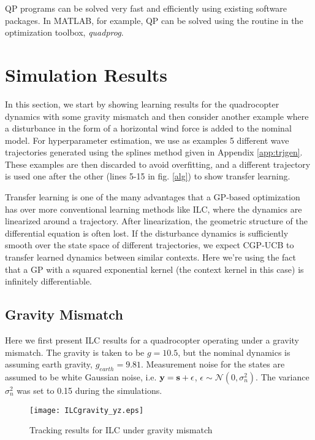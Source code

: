 QP programs can be solved very fast and efficiently using existing software packages. In MATLAB, for example, QP can be solved using the routine in the optimization toolbox, \emph{quadprog}.


\section{Simulation Results}
\label{Results1}
In this section, we start by showing learning results for the quadrocopter dynamics with some gravity mismatch and then consider another example where a disturbance in the form of a horizontal wind force is added to the nominal model. For hyperparameter estimation, we use as examples 5 different wave trajectories generated using the splines method given in Appendix \ref{app:trjgen}. These examples are then discarded to avoid overfitting, and a different trajectory is used one after the other (lines 5-15 in fig. \ref{alg}) to show transfer learning. 

Transfer learning is one of the many advantages that a GP-based optimization has over more conventional learning methods like ILC, where the dynamics are linearized around a trajectory. After linearization, the geometric structure of the differential equation is often lost. If the disturbance dynamics is sufficiently smooth over the state space of different trajectories, we expect CGP-UCB to transfer learned dynamics between similar contexts. Here we're using the fact that a GP with a squared exponential kernel (the context kernel in this case) is infinitely differentiable. 

\subsection{Gravity Mismatch}
Here we first present ILC results for a quadrocopter operating under a gravity mismatch. The gravity is taken to be $g = 10.5$, but the nominal dynamics is assuming earth gravity, $g_{earth} = 9.81$. Measurement noise for the states are assumed to be white Gaussian noise, i.e. $\mathbf{y} = \mathbf{s} + \epsilon$, $\epsilon \sim \mathcal{N}(0,\sigma_{n}^{2})$. The variance $\sigma_{n}^{2}$ was set to 0.15 during the simulations.

\begin{figure}
\center	
\texttt{[image: ILCgravity\_yz.eps]}	
\caption{Tracking results for ILC under gravity mismatch}
\label{fig:ilc_x1}
\end{figure}

